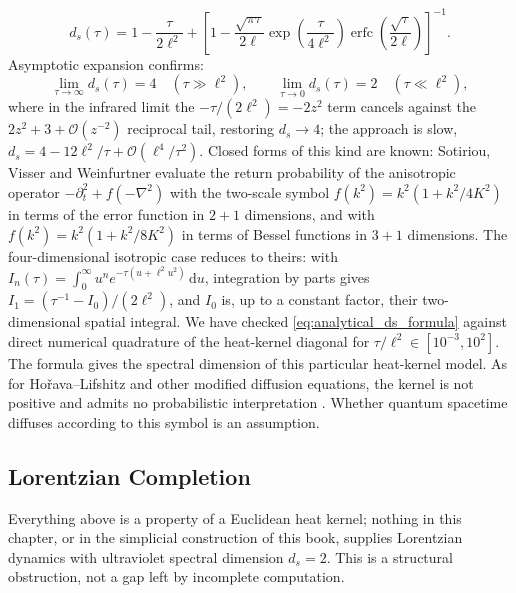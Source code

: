\documentclass[11pt,a4paper,reqno]{amsart}
\theoremstyle{definition}
\numberwithin{equation}{section}
\newcommand{\dif}{\,\mathrm{d}}
\begin{document}
\begin{equation}
    \label{eq:analytical_ds_formula}
    d_s(\tau) = 1 - \frac{\tau}{2\ell^2} + \left[ 1 - \frac{\sqrt{\pi \tau}}{2\ell} \exp\!\left(\frac{\tau}{4\ell^2}\right) \operatorname{erfc}\!\left(\frac{\sqrt{\tau}}{2\ell}\right) \right]^{-1}.
\end{equation}
Asymptotic expansion confirms:
\begin{equation}
    \lim_{\tau \to \infty} d_s(\tau) = 4 \quad (\tau \gg \ell^2), \qquad \lim_{\tau \to 0} d_s(\tau) = 2 \quad (\tau \ll \ell^2),
\end{equation}
where in the infrared limit the $-\tau/(2\ell^2) = -2z^2$ term cancels against the $2z^2 + 3 + \mathcal{O}(z^{-2})$ reciprocal tail, restoring $d_s \to 4$; the approach is slow, $d_s = 4 - 12\ell^2/\tau + \mathcal{O}(\ell^4/\tau^2)$. Closed forms of this kind are known: Sotiriou, Visser and Weinfurtner \cite{sotiriou2011dispersion} evaluate the return probability of the anisotropic operator $-\partial_t^2 + f(-\nabla^2)$ with the two-scale symbol $f(k^2) = k^2(1 + k^2/4K^2)$ in terms of the error function in $2+1$ dimensions, and with $f(k^2) = k^2(1 + k^2/8K^2)$ in terms of Bessel functions in $3+1$ dimensions. The four-dimensional isotropic case reduces to theirs: with $I_n(\tau) = \int_0^\infty u^n e^{-\tau(u + \ell^2 u^2)} \dif u$, integration by parts gives $I_1 = (\tau^{-1} - I_0)/(2\ell^2)$, and $I_0$ is, up to a constant factor, their two-dimensional spatial integral. We have checked \eqref{eq:analytical_ds_formula} against direct numerical quadrature of the heat-kernel diagonal for $\tau/\ell^2 \in [10^{-3}, 10^{2}]$. The formula gives the spectral dimension of this particular heat-kernel model. As for Ho\v{r}ava--Lifshitz and other modified diffusion equations, the kernel is not positive and admits no probabilistic interpretation \cite{calcagni2013probing}. Whether quantum spacetime diffuses according to this symbol is an assumption.

\subsection{Lorentzian Completion}
\label{sec:lorentzian_completion}

Everything above is a property of a Euclidean heat kernel; nothing in this chapter, or in the simplicial construction of this book, supplies Lorentzian dynamics with ultraviolet spectral dimension $d_s = 2$. This is a structural obstruction, not a gap left by incomplete computation.
\end{document}
